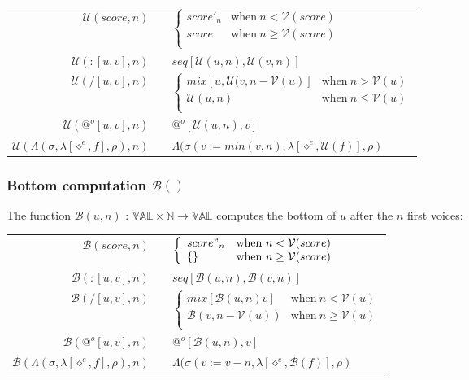\documentclass[10pt,a4paper,frenchb]{article}
\makeatletter
\newcommand{\var}[1]{\diamond^#1}
\newcommand{\es}{\{\}}
\newcommand{\val}{\mathbb{VAL}}
\newcommand{\closure}{\Lambda}
\newcommand{\noredex}{@^o}
\newcommand{\bdomain}[3]{$#1 \times #2 \rightarrow #3$}
\newcommand{\envsym}{\rho}
\newcommand{\closenv}[3][\var{e}]{\closure(#3,\lambda[#1,#2],\envsym)}
\newcommand{\seq}			{:}
\newcommand{\voices}		{{\mathcal V}}
\renewcommand{\top}		{{\mathcal U}}
\newcommand{\bottom}		{{\mathcal B}}
\newcommand{\bounds}		{\sigma}
\makeatother
\begin{document}
\begin{center}
\begin{tabular*}{12cm}{rc@{ $\rightarrow$ }l}
 \hline
 $\top(score,n)$				& & $\left\{ \begin{array}{ll}
 								score'_{n} & \mathrm{when} \  n < \voices(score) \\
								score & \mathrm{when} \  n \geq \voices(score) \\
	 							\end{array} \right.$ \\
 $\top(\seq [u,v],n)$		& & $seq[\top(u, n),\top(v, n)]$ \\
 $\top(/ [u,v],n)$ 			& & $\left\{ \begin{array}{ll}
 								mix[u,\top(v,n-\voices(u)] & \mathrm{when} \  n > \voices(u) \\
								\top(u,n) & \mathrm{when} \  n \leq\voices(u) \\
	 							\end{array} \right.$ \\
 $\top(\noredex [u,v],n)$ 	& & $\noredex[\top(u,n),v]$ \\
 $\top(\closenv{f}{\bounds},n)$ 	& &  $\closenv{\top(f)}{\bounds(v:=min(v,n)}$ \\
 \hline
\end{tabular*}
\end{center}

\subsubsection{Bottom computation $\bottom()$}
The function $\bottom(u,n)$ :  \bdomain{\val}{\mathbb{N}}{\val} computes the bottom of $u$ after the $n$ first voices:

\begin{center}
\begin{tabular*}{12cm}{rc@{ $\rightarrow$ }l}
 \hline
 $\bottom(score,n)$				& & $\left\{ \begin{array}{ll}
 								score"_{n} & \mathrm{when} \  n < \voices(score) \\
								\es & \mathrm{when} \  n \geq \voices(score) \\
	 							\end{array} \right.$ \\
 $\bottom(\seq [u,v],n)$		& & $seq[\bottom(u, n), \bottom(v, n)]$ \\
 $\bottom(/ [u,v],n)$ 			& & $\left\{ \begin{array}{ll}
 								mix[\bottom(u,n) v] & \mathrm{when} \  n < \voices(u) \\
								\bottom(v,n - \voices(u)) & \mathrm{when} \  n \geq\voices(u) \\
	 							\end{array} \right.$ \\
 $\bottom(\noredex [u,v],n)$ 	& & $\noredex[\bottom(u,n),v]$ \\
 $\bottom(\closenv{f}{\bounds},n)$ 	& &  $\closenv{\bottom(f)}{\bounds(v:=v-n}$ \\
 \hline
\end{tabular*}
\end{center}
\end{document}
